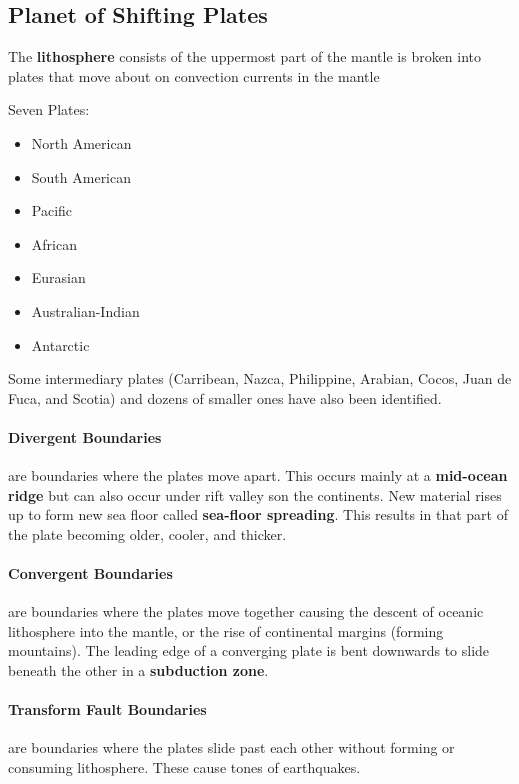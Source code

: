\documentclass{article}
\begin{document}
\subsection{Planet of Shifting Plates} %
\label{sub:planet_of_shifting_plates}
The \textbf{lithosphere} consists of the uppermost part of the mantle is broken into plates that move about on convection currents in the mantle

Seven Plates:
\begin{itemize}
    \item North American
    \item South American
    \item Pacific
    \item African
    \item Eurasian
    \item Australian-Indian
    \item Antarctic
\end{itemize}
Some intermediary plates (Carribean, Nazca, Philippine, Arabian, Cocos, Juan de Fuca, and Scotia) and dozens of smaller ones have also been identified.

\paragraph{Divergent Boundaries} are boundaries where the plates move apart. This occurs mainly at a \textbf{mid-ocean ridge} but can also occur under rift valley son the continents. New material rises up to form new sea floor called \textbf{sea-floor spreading}. This results in that part of the plate becoming older, cooler, and thicker.

\paragraph{Convergent Boundaries} are boundaries where the plates move together causing the descent of oceanic lithosphere into the mantle, or the rise of continental margins (forming mountains). The leading edge of a converging plate is bent downwards to slide beneath the other in a \textbf{subduction zone}.

\paragraph{Transform Fault Boundaries} are boundaries where the plates slide past each other without forming or consuming lithosphere. These cause tones of earthquakes.
\end{document}
